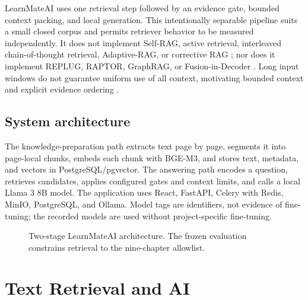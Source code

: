 \documentclass[conference]{IEEEtran}
\begin{document}
LearnMateAI uses one retrieval step followed by an evidence gate, bounded context packing, and local generation. This intentionally separable pipeline suits a small closed corpus and permits retriever behavior to be measured independently. It does not implement Self-RAG, active retrieval, interleaved chain-of-thought retrieval, Adaptive-RAG, or corrective RAG \cite{r21,r22,r23,r24,r25}; nor does it implement REPLUG, RAPTOR, GraphRAG, or Fusion-in-Decoder \cite{r26,r27,r28,r29}. Long input windows do not guarantee uniform use of all context, motivating bounded context and explicit evidence ordering \cite{r20}.

\subsection{System architecture}
The knowledge-preparation path extracts text page by page, segments it into page-local chunks, embeds each chunk with BGE-M3, and stores text, metadata, and vectors in PostgreSQL/pgvector. The answering path encodes a question, retrieves candidates, applies configured gates and context limits, and calls a local Llama 3 8B model. The application uses React, FastAPI, Celery with Redis, MinIO, PostgreSQL, and Ollama. Model tags are identifiers, not evidence of fine-tuning; the recorded models are used without project-specific fine-tuning.

\begin{figure}[t]
\centering
{}
\caption{Two-stage LearnMateAI architecture. The frozen evaluation constrains retrieval to the nine-chapter allowlist.}
\label{fig:architecture}
\end{figure}

\section{Text Retrieval and AI}
\end{document}
